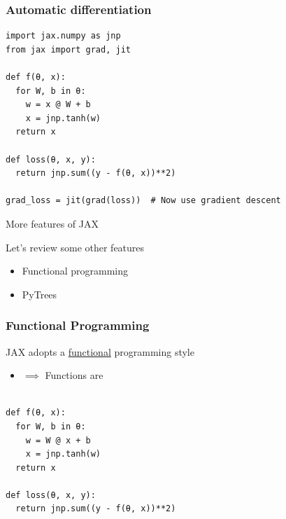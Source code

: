 \begin{frame}[fragile]
    \frametitle{Automatic differentiation}
    
    \vspace{-1em}
    \begin{verbatim}
import jax.numpy as jnp
from jax import grad, jit

def f(θ, x):
  for W, b in θ:
    w = x @ W + b
    x = jnp.tanh(w)  
  return x

def loss(θ, x, y):
  return jnp.sum((y - f(θ, x))**2)

grad_loss = jit(grad(loss))  # Now use gradient descent 
    \end{verbatim}

\end{frame}



\begin{frame}{More features of JAX}

    Let's review some other features

        \vspace{0.5em}

    \begin{itemize}
        \item Functional programming
        \vspace{0.5em}
        \item PyTrees
    \end{itemize}
    
\end{frame}

\begin{frame}[fragile]
    \frametitle{Functional Programming}
    
    JAX adopts a \underline{functional} programming style

    \vspace{0.5em}
    \begin{itemize}
        \item[] $\implies$ Functions are 
    \end{itemize}


    \begin{verbatim}

def f(θ, x):
  for W, b in θ:
    w = W @ x + b
    x = jnp.tanh(w)  
  return x

def loss(θ, x, y):
  return jnp.sum((y - f(θ, x))**2)

    \end{verbatim}


\end{frame}

